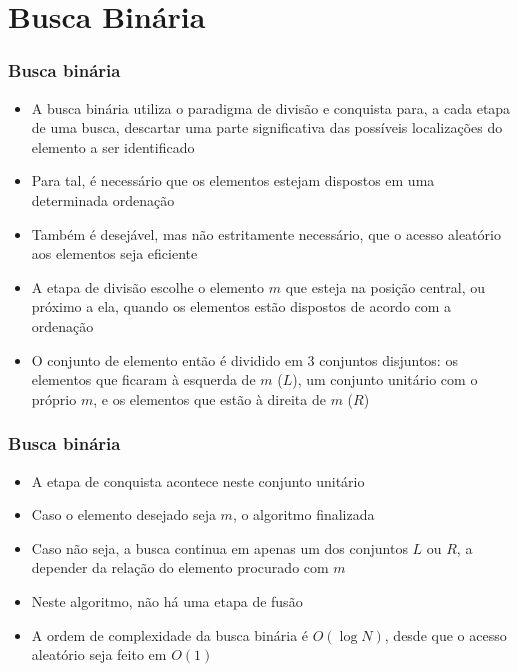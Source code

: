 \section{Busca Binária}

\begin{frame}[fragile]\frametitle{Busca binária}

    \begin{itemize}
        \item A busca binária utiliza o paradigma de divisão e conquista para, a cada etapa de
            uma busca, descartar uma parte significativa das possíveis localizações do elemento a
            ser identificado

        \item Para tal, é necessário que os elementos estejam dispostos em uma determinada 
            ordenação

        \item Também é desejável, mas não estritamente necessário, que o acesso aleatório aos
            elementos seja eficiente

        \item A etapa de divisão escolhe o elemento $m$ que esteja na posição central, ou próximo a
            ela, quando os elementos estão dispostos de acordo com a ordenação

        \item O conjunto de elemento então é dividido em 3 conjuntos disjuntos: os elementos que
            ficaram à esquerda de $m$ ($L$), um conjunto unitário com o próprio $m$, e os elementos
            que estão à direita de $m$ ($R$)
    \end{itemize}

\end{frame}

\begin{frame}[fragile]\frametitle{Busca binária}

    \begin{itemize}
        \item A etapa de conquista acontece neste conjunto unitário

        \item Caso o elemento desejado seja $m$, o algoritmo finalizada

        \item Caso não seja, a busca continua em apenas um dos conjuntos $L$ ou $R$, a depender
            da relação do elemento procurado com $m$

        \item Neste algoritmo, não há uma etapa de fusão

		\item A ordem de complexidade da busca binária é $O(\log N)$, desde que o acesso aleatório
            seja feito em $O(1)$
    \end{itemize}

\end{frame}

